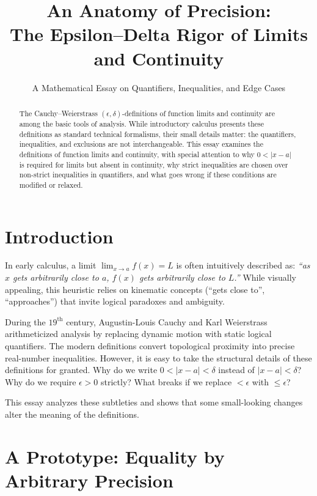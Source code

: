 \documentclass{essay}
\title{An Anatomy of Precision:\\The Epsilon--Delta Rigor of Limits and Continuity}
\subtitle{A Mathematical Essay on Quantifiers, Inequalities, and Edge Cases}
\author{}
\date{}
\begin{document}
\maketitle

\begin{abstract}
  \noindent
  The Cauchy--Weierstrass \((\epsilon, \delta)\)-definitions of function limits and continuity are among the basic tools of analysis. While introductory calculus presents these definitions as standard technical formalisms, their small details matter: the quantifiers, inequalities, and exclusions are not interchangeable. This essay examines the definitions of function limits and continuity, with special attention to why \(0 < |x - a|\) is required for limits but absent in continuity, why strict inequalities are chosen over non-strict inequalities in quantifiers, and what goes wrong if these conditions are modified or relaxed.
\end{abstract}

\tableofcontents

\section{Introduction}

In early calculus, a limit \(\lim_{x \to a} f(x) = L\) is often intuitively described as: \textit{``as \(x\) gets arbitrarily close to \(a\), \(f(x)\) gets arbitrarily close to \(L\).''} While visually appealing, this heuristic relies on kinematic concepts (``gets close to'', ``approaches'') that invite logical paradoxes and ambiguity.

During the \(19^{\text{th}}\) century, Augustin-Louis Cauchy and Karl Weierstrass arithmeticized analysis by replacing dynamic motion with static logical quantifiers. The modern definitions convert topological proximity into precise real-number inequalities. However, it is easy to take the structural details of these definitions for granted. Why do we write \(0 < |x - a| < \delta\) instead of \(|x - a| < \delta\)? Why do we require \(\epsilon > 0\) strictly? What breaks if we replace \(< \epsilon\) with \(\le \epsilon\)?

This essay analyzes these subtleties and shows that some small-looking changes alter the meaning of the definitions.

\section{A Prototype: Equality by Arbitrary Precision}
\end{document}
